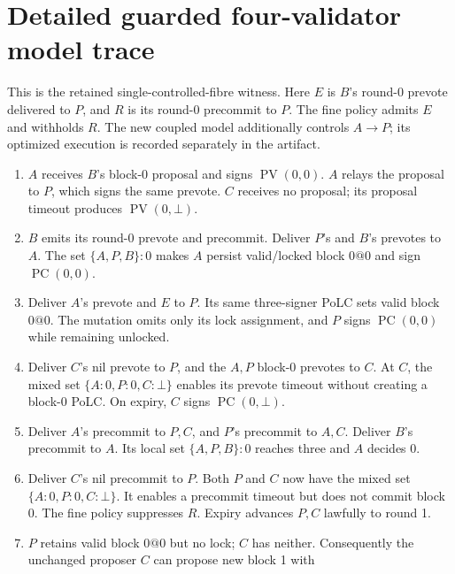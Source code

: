 \section{Detailed guarded four-validator model
trace}\label{detailed-guarded-four-validator-model-trace}

\label{app:trace}

This is the retained single-controlled-fibre witness. Here \(E\) is
\(B\)'s round-0 prevote delivered to \(P\), and \(R\) is its round-0
precommit to \(P\). The fine policy admits \(E\) and withholds \(R\).
The new coupled model additionally controls \(A\to P\); its optimized
execution is recorded separately in the artifact.

\begin{enumerate}
\def\labelenumi{\arabic{enumi}.}
\tightlist
\item
  \(A\) receives \(B\)'s block-0 proposal and signs
  \(\operatorname{PV}(0,0)\). \(A\) relays the proposal to \(P\), which
  signs the same prevote. \(C\) receives no proposal; its proposal
  timeout produces \(\operatorname{PV}(0,\bot)\).
\item
  \(B\) emits its round-0 prevote and precommit. Deliver \(P\)'s and
  \(B\)'s prevotes to \(A\). The set \(\{A,P,B\}:0\) makes \(A\) persist
  valid/locked block \(0@0\) and sign \(\operatorname{PC}(0,0)\).
\item
  Deliver \(A\)'s prevote and \(E\) to \(P\). Its same three-signer PoLC
  sets valid block \(0@0\). The mutation omits only its lock assignment,
  and \(P\) signs \(\operatorname{PC}(0,0)\) while remaining unlocked.
\item
  Deliver \(C\)'s nil prevote to \(P\), and the \(A,P\) block-0 prevotes
  to \(C\). At \(C\), the mixed set \(\{A:0,P:0,C:\bot\}\) enables its
  prevote timeout without creating a block-0 PoLC. On expiry, \(C\)
  signs \(\operatorname{PC}(0,\bot)\).
\item
  Deliver \(A\)'s precommit to \(P,C\), and \(P\)'s precommit to
  \(A,C\). Deliver \(B\)'s precommit to \(A\). Its local set
  \(\{A,P,B\}:0\) reaches three and \(A\) decides 0.
\item
  Deliver \(C\)'s nil precommit to \(P\). Both \(P\) and \(C\) now have
  the mixed set \(\{A:0,P:0,C:\bot\}\). It enables a precommit timeout
  but does not commit block 0. The fine policy suppresses \(R\). Expiry
  advances \(P,C\) lawfully to round 1.
\item
  \(P\) retains valid block \(0@0\) but no lock; \(C\) has neither.
  Consequently the unchanged proposer \(C\) can propose new block 1 with

\end{enumerate}
